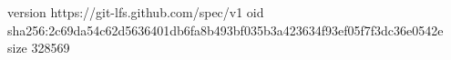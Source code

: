 version https://git-lfs.github.com/spec/v1
oid sha256:2c69da54c62d5636401db6fa8b493bf035b3a423634f93ef05f7f3dc36e0542e
size 328569
